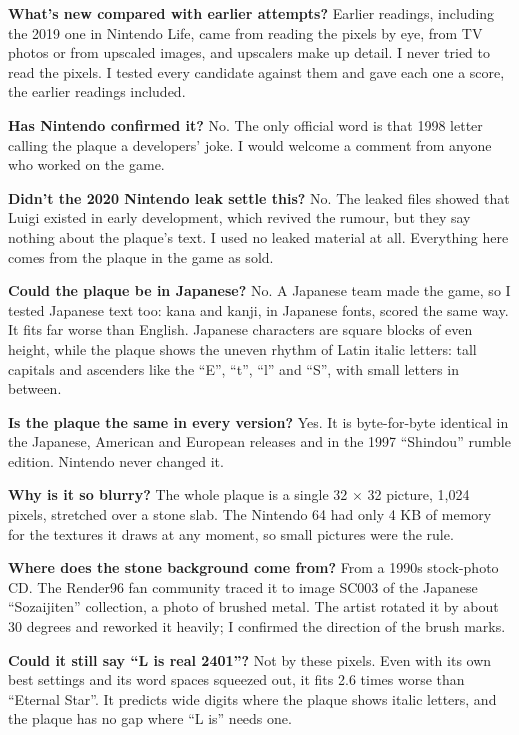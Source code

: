 \documentclass[11pt,a4paper]{article}
\begin{document}
\textbf{What's new compared with earlier attempts?} Earlier readings, including the 2019 one in Nintendo Life, came from reading the pixels by eye, from TV photos or from upscaled images, and upscalers make up detail. I never tried to read the pixels. I tested every candidate against them and gave each one a score, the earlier readings included.

\textbf{Has Nintendo confirmed it?} No. The only official word is that 1998 letter calling the plaque a developers' joke. I would welcome a comment from anyone who worked on the game.

\textbf{Didn't the 2020 Nintendo leak settle this?} No. The leaked files showed that Luigi existed in early development, which revived the rumour, but they say nothing about the plaque's text. I used no leaked material at all. Everything here comes from the plaque in the game as sold.

\textbf{Could the plaque be in Japanese?} No. A Japanese team made the game, so I tested Japanese text too: kana and kanji, in Japanese fonts, scored the same way. It fits far worse than English. Japanese characters are square blocks of even height, while the plaque shows the uneven rhythm of Latin italic letters: tall capitals and ascenders like the ``E'', ``t'', ``l'' and ``S'', with small letters in between.

\textbf{Is the plaque the same in every version?} Yes. It is byte-for-byte identical in the Japanese, American and European releases and in the 1997 ``Shindou'' rumble edition. Nintendo never changed it.

\textbf{Why is it so blurry?} The whole plaque is a single 32 $\times$ 32 picture, 1,024 pixels, stretched over a stone slab. The Nintendo 64 had only 4 KB of memory for the textures it draws at any moment, so small pictures were the rule.

\textbf{Where does the stone background come from?} From a 1990s stock-photo CD. The Render96 fan community traced it to image SC003 of the Japanese ``Sozaijiten'' collection, a photo of brushed metal. The artist rotated it by about 30 degrees and reworked it heavily; I confirmed the direction of the brush marks.

\textbf{Could it still say ``L is real 2401''?} Not by these pixels. Even with its own best settings and its word spaces squeezed out, it fits 2.6 times worse than ``Eternal Star''. It predicts wide digits where the plaque shows italic letters, and the plaque has no gap where ``L is'' needs one.
\end{document}
